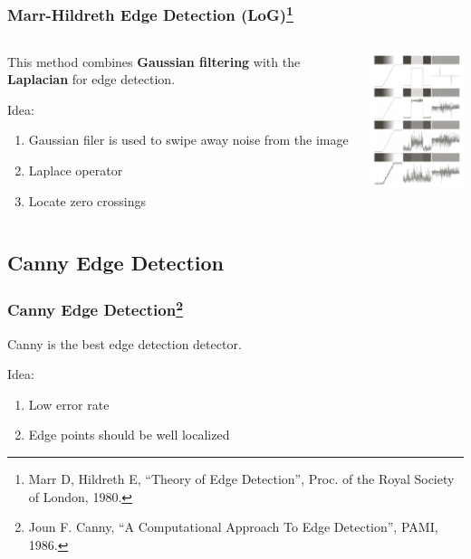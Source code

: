 \documentclass[notheorems,serif,table,compress]{beamer}  %
\begin{document}
\begin{frame}
\frametitle{Marr-Hildreth Edge Detection (LoG)\footnote{Marr D, Hildreth E, ``Theory of Edge Detection'', Proc. of the Royal Society of London, 1980.}}
    \begin{columns}
        \begin{column}{0.55\linewidth}
            This method combines {\textbf{Gaussian filtering}} with the {\textbf{Laplacian}} for edge detection.\newline
            
            {\color{blue}Idea:}
            \begin{enumerate}
            \item {\color{blue}Gaussian filer} is used to swipe away noise from the image
            \item {\color{blue}Laplace operator}
            \item  Locate {\color{blue}zero crossings}
            \end{enumerate}
        \end{column}
        \begin{column}{0.45\linewidth}
            \centering\includegraphics[width=1.5in]{erjie.png}
        \end{column}
    \end{columns}\vspace{1ex}
\end{frame}


\subsection{Canny Edge Detection}

\begin{frame}
\frametitle{Canny Edge Detection\footnote{Joun F. Canny, ``A Computational Approach To Edge Detection'', PAMI, 1986.}}
Canny is the best edge detection detector.\newline

    {\color{blue}Idea:}
    \begin{enumerate}
        \item Low error rate
        \item Edge points should be well localized
    \end{enumerate}
\end{frame}
\end{document}
